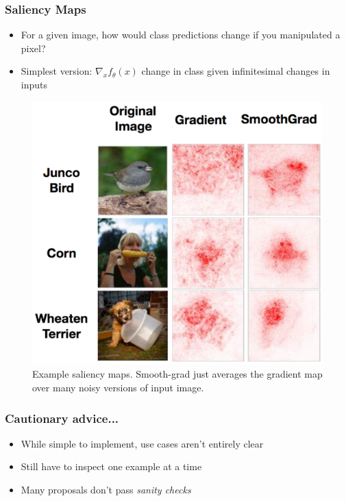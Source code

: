 \documentclass[10pt,mathserif]{beamer}
\begin{document}
\begin{frame}
  \frametitle{Saliency Maps}
  \begin{itemize}
  \item For a given image, how would class predictions change if you manipulated
    a pixel?
  \item Simplest version: $\nabla_{x} f_{\theta}\left(x\right)$ change in class
    given infinitesimal changes in inputs
  \end{itemize} 
\begin{figure}[ht]
  \centering
  \includegraphics[width=0.4\paperwidth]{figure/saliency}
  \caption{Example saliency maps. Smooth-grad just averages the gradient map
    over many noisy versions of input image.\label{fig:saliency} }
\end{figure}
\end{frame}

\begin{frame}
  \frametitle{Cautionary advice...}
 \begin{itemize}
 \item While simple to implement, use cases aren't entirely clear
 \item Still have to inspect one example at a time
 \item Many proposals don't pass \textit{sanity checks}
 \end{itemize} 
\end{frame}
\end{document}
